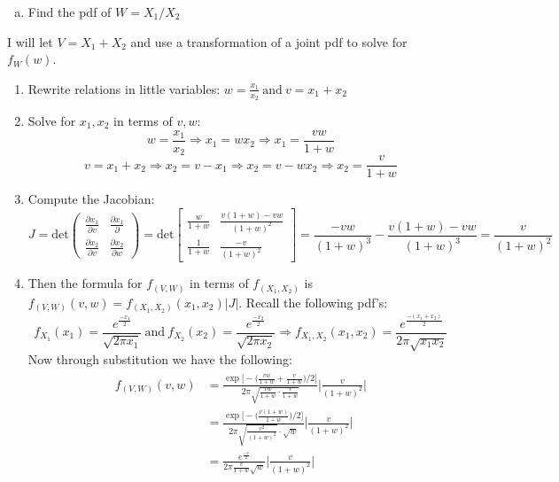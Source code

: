 \documentclass[11pt]{article}
\theoremstyle{definition}
\newcommand{\1}[1]{\mathbf{1} \left \{ #1 \right \}}
\begin{document}
\begin{itemize}
\begin{enumerate}[(b)]
\item Find the pdf of $W = X_1/X_2$
\end{enumerate}
I will let $V = X_1 + X_2$ and use a transformation of a joint pdf to solve for $f_W (w)$.
\begin{enumerate}
    \item Rewrite relations in little variables: \(w = \frac{x_1}{x_2} \ \text{and} \ v = x_1 + x_2\)
    \item Solve for $x_1, x_2$ in terms of $v,w$:
    \[w = \frac{x_1}{x_2} \Rightarrow x_1 = wx_2 \Rightarrow x_1 = \frac{vw}{1+w}\]
    \[v = x_1 + x_2 \Rightarrow x_2 = v - x_1 \Rightarrow x_2 = v - wx_2 \Rightarrow x_2 = \frac{v}{1+w}\]
    \item Compute the Jacobian:
    \[J = \text{det}
    \begin{pmatrix}
    \frac{\partial x_1}{\partial v} & \frac{\partial x_1}{\partial } \\
    \frac{\partial x_2}{\partial v} & \frac{\partial x_2}{\partial w}
    \end{pmatrix} = \text{det}
    \begin{bmatrix}
    \frac{w}{1+w} & \frac{v(1+w)-vw}{(1+w)^2} \\
    \frac{1}{1+w} & \frac{-v}{(1+w)^2}
    \end{bmatrix} = \frac{-vw}{(1+w)^3} - \frac{v(1+w)-vw}{(1+w)^3} = \frac{v}{(1+w)^2}
    \]
    \item Then the formula for $f_{(V,W)}$ in terms of $f_{(X_1,X_2)}$ is \(f_{(V,W)} (v,w) = f_{(X_1,X_2)} (x_1,x_2) |J|\).
    Recall the following pdf's:
    \[f_{X_1} (x_1) = \frac{e^{\frac{-x_1}{2}}}{\sqrt{2\pi x_1}} \ \text{and} \ f_{X_2} (x_2) = \frac{e^{\frac{-x_2}{2}}}{\sqrt{2\pi x_2}} \Rightarrow f_{X_1,X_2} (x_1,x_2) = \frac{e^{\frac{-(x_1+x_2)}{2}}}{2\pi \sqrt{x_1 x_2}}\]
    Now through substitution we have the following:
    \begin{align*}
        \begin{split}
            f_{(V,W)} (v,w) &= \frac{\exp\big[-\big(\frac{vw}{1+w} + \frac{v}{1+w} \big)/2\big]}{2\pi \sqrt{\frac{vw}{1+w} \cdot \frac{v}{1+w}}} \Bigg|\frac{v}{(1+w)^2}\Bigg| \\
            &= \frac{\exp\big[-\big(\frac{v(1+w)}{1+w} \big)/2\big]}{2\pi \sqrt{\frac{v^2}{(1+w)^2}} \cdot \sqrt{w}} \Bigg|\frac{v}{(1+w)^2}\Bigg| \\
            &= \frac{e^{\frac{-v}{2}}}{2\pi \frac{v}{1+w} \sqrt{w}} \Bigg|\frac{v}{(1+w)^2}\Bigg| \\

\end{split}
\end{align*}
\end{enumerate}
\end{itemize}
\end{document}
